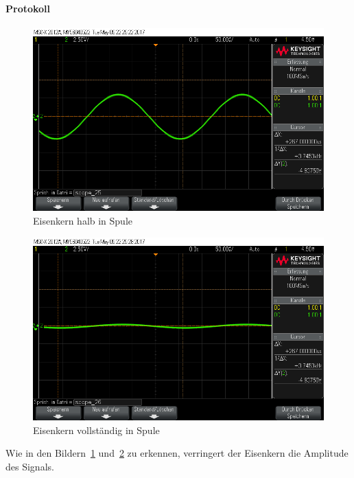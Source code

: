 \documentclass[10pt]{scrreprt}
\begin{document}
        \paragraph{Protokoll}
        \begin{center}
            \begin{figure}[H]
                \includegraphics[width=\textwidth]{scope_25.png}
                \caption{Eisenkern halb in Spule}
                \label{fig:eisen1}
            \end{figure}
            \begin{figure}[H]
                \includegraphics[width=\textwidth]{scope_26.png}
                \caption{Eisenkern vollständig in Spule}
                \label{fig:eisen2}
            \end{figure}
        \end{center}

        Wie in den Bildern~\ref{fig:eisen1} und~\ref{fig:eisen2} zu erkennen,
        verringert der Eisenkern die Amplitude des Signals.
\end{document}
